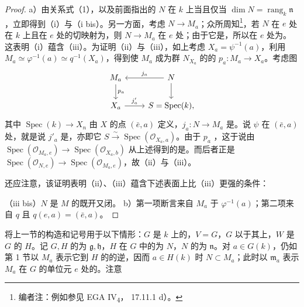 \begin{proof}
a）由关系式（1），以及前面指出的 $N$ 在 $k$ 上当且仅当 $\dim N=\operatorname{rang}_k\mathfrak n$，立即得到（i）与（i bis）。另一方面，考虑 $N\to M_a$；众所周知\footnote{编者注：例如参见 EGA IV\textsubscript{4}， 17.11.1 d）。}，若 $N$ 在 $e$ 处在 $k$ 上且在 $e$ 处的切映射为，则 $N\to M_a$ 在 $e$ 处；由于它是，所以在 $e$ 处为。这表明（i）蕴含（iii）。为证明（ii）与（iii），如上考虑 $X_a=\psi^{-1}(a)$，利用 $M_a\simeq\varphi^{-1}(a)\simeq q^{-1}(X_a)$，得到使 $M_a$ 成为群 $N_{X_a}$ 的的 $p_a:M_a\to X_a$。考虑图
\[
\begin{tikzcd}
M_a\arrow[d,"p_a"]&N\arrow[l,"j_a"']\arrow[d]\\
X_a\arrow[r,"j'_a"]&S=\operatorname{Spec}(k),
\end{tikzcd}
\]
其中 $\operatorname{Spec}(k)\to X_n$ 由 $X$ 的点 $(\bar e,a)$ 定义，$j_a:N\to M_a$ 是。说 $\psi$ 在 $(\bar e,a)$ 处，就是说 $j'_a$ 是，亦即它 $S\xrightarrow{\sim}\operatorname{Spec}(\mathscr O_{X_a,a})$。由于 $p_a$ ，这于说由 $\operatorname{Spec}(\mathscr O_{M_a,e})\to\operatorname{Spec}(\mathscr O_{X_a,b})$ 从上述得到的是。而后者正是 $\operatorname{Spec}(\mathscr O_{N,e})\to\operatorname{Spec}(\mathscr O_{M_a,e})$，故（ii）与（iii）。

还应注意，该证明表明（ii）、（iii）蕴含下述表面上比（iii）更强的条件：

（iii bis）$N$ 是 $M$ 的既开又闭。
 b）第一项断言来自 $M_a$ 于 $\varphi^{-1}(a)$；第二项来自 $q$ 且 $q(e,a)=(\bar e,a)$。
\end{proof}
将上一节的构造和记号用于以下情形：$G$ 是 $k$ 上的，$V=G$，$G$ 以于其上，$W$ 是 $G$ 的 $H$。记 $G,H$ 的为 $\mathfrak g,\mathfrak h$，$H$ 在 $G$ 中的为 $N$，$N$ 的为 $\mathfrak n$。对 $a\in G(k)$，仍如第 1 节以 $M_a$ 表示它到 $H$ 的的逆，因而 $a\in H(k)$ 时 $N\subset M_a$；此时以 $\mathfrak m_a$ 表示 $M_a$ 在 $G$ 的单位元 $e$ 处的。注意
